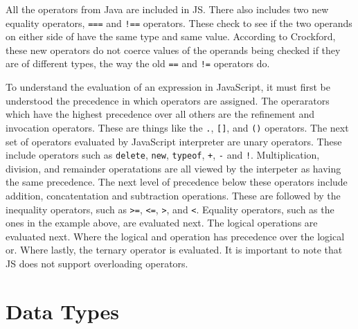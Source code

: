 \documentclass[man]{apa}
\begin{document}


All the operators from Java are included in JS. There also includes two new equality operators, \texttt{===} and \texttt{!==} operators. These check to see if the two operands on either side of have the same type and same value. According to Crockford, these new operators do not coerce values of the operands being checked if they are of different types, the way the old \texttt{==} and \texttt{!=} operators do.



To understand the evaluation of an expression in JavaScript, it must first be understood the precedence in which operators are assigned. The operarators which have the highest precedence over all others are the refinement and invocation operators. These are things like the \texttt{.}, \texttt{[]}, and \texttt{()} operators. The next set of operators evaluated by JavaScript interpreter are unary operators. These include operators such as \texttt{delete}, \texttt{new}, \texttt{typeof}, \texttt{+}, \texttt{-} and \texttt{!}. Multiplication, division, and remainder operatations are all viewed by the interpeter as having the same precedence. The next level of precedence below these operators include addition, concatentation and subtraction operations. These are followed by the inequality operators, such as \texttt{>=}, \texttt{<=}, \texttt{>}, and \texttt{<}. Equality operators, such as the ones in the example above, are evaluated next. The logical operations are evaluated next. Where the logical and operation has precedence over the logical or. Where lastly, the ternary operator is evaluated. It is important to note that JS does not support overloading operators.

\section{Data Types}
\end{document}
